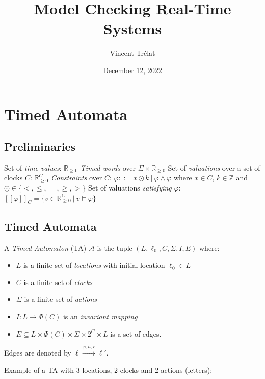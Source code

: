 \documentclass{beamer}
\title[Model Checking Real-Time Systems]{Model Checking Real-Time Systems}
\date{December 12, 2022}
\author[V. Trélat]{Vincent Trélat}
\institute[TUM]{Technical University of Munich}
\theoremstyle{definition}
\begin{document}
\begin{frame}
\titlepage
\end{frame}

\begin{frame}
\tableofcontents
\end{frame}

\section{Timed Automata}
\subsection{Preliminaries}

\begin{frame}
  Set of \emph{time values}: $\mathbb{R}_{\geq 0}$
  \vfill
  \emph{Timed words} over $\Sigma \times \mathbb{R}_{\geq 0}$
  \vfill
  Set of \emph{valuations} over a set of clocks $C$: $\mathbb{R}_{\geq 0}^C$
  \vfill
  \emph{Constraints} over $C$: $\varphi ::= x \odot k\ |\ \varphi \land \varphi$ where $x \in C$, $k \in \mathbb{Z}$ and $\odot \in \{<, \leq, =, \geq, >\}$
  \vfill
  Set of valuations \emph{satisfying} $\varphi$: $[\![\varphi]\!]_C = \{v \in \mathbb{R}_{\geq 0}^C\ |\ v \models \varphi\}$
\end{frame}


\subsection{Timed Automata}

\begin{frame}
  \begin{definition}
    A \emph{Timed Automaton} (TA) $\mathcal{A}$ is the tuple $(L, \ell_0, C, \Sigma, I, E)$ where:
    \begin{itemize}
      \item $L$ is a finite set of \emph{locations} with initial location $\ell_0 \in L$
      \item $C$ is a finite set of \emph{clocks}
      \item $\Sigma$ is a finite set of \emph{actions}
      \item $I \colon L \to \varPhi(C)$ is an \emph{invariant mapping}
      \item $E \subseteq L \times \varPhi(C) \times \Sigma \times 2^{C} \times L$ is a set of edges.
    \end{itemize}
  \end{definition}
  \vfill
  Edges are denoted by $\ell \xrightarrow{\varphi, a, r} \ell'$.
\end{frame}
\begin{frame}
  Example of a TA with 3 locations, 2 clocks and 2 actions (letters):
\end{frame}
\end{document}

